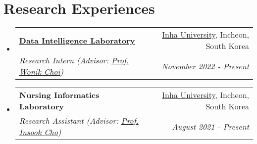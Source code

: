 \documentclass[letterpaper,11pt]{article}
\makeatletter
\newcommand{\resumeSubheading}[4]{
  \vspace{-1pt}\item
    \begin{tabular*}{0.97\textwidth}{l@{\extracolsep{\fill}}r}
      \textbf{#1} & #2 \\
      \textit{\small#3} & \textit{\small #4} \\
    \end{tabular*}\vspace{-5pt}
}
\makeatother
\begin{document}
    \section{Research Experiences}
    \begin{itemize}[leftmargin=*,label=]
        \resumeSubheading
        {\href{http://dilab.inha.ac.kr/}{Data Intelligence Laboratory}}{\href{https://eng.inha.ac.kr/eng/index.do}{Inha University}, Incheon, South Korea}
            {Research Intern (Advisor: \href{http://bit.ly/3zSrQ8F}{Prof. Wonik Choi}) }{November 2022 - Present}
        \resumeSubheading
        {Nursing Informatics Laboratory}{\href{https://eng.inha.ac.kr/eng/index.do}{Inha University}, Incheon, South Korea}
            {Research Assistant (Advisor: \href{http://bit.ly/412nYOw}{Prof. Insook Cho})}{August 2021 - Present}
    \end{itemize}
    
\end{document}

